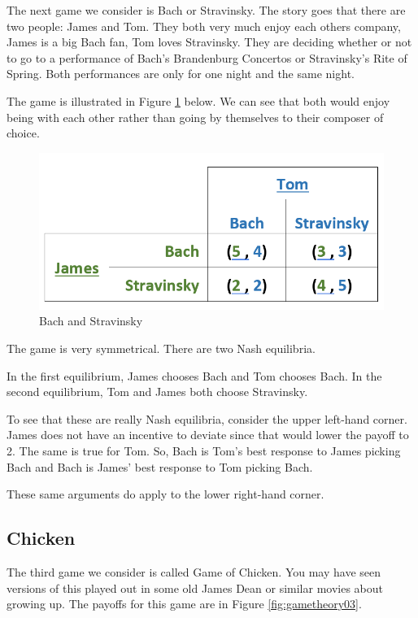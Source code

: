 \documentclass[
]{book}
\begin{document}
The next game we consider is Bach or Stravinsky. The story goes that there are two people: James and Tom. They both very much enjoy each others company, James is a big Bach fan, Tom loves Stravinsky. They are deciding whether or not to go to a performance of Bach's Brandenburg Concertos or Stravinsky's Rite of Spring. Both performances are only for one night and the same night.

The game is illustrated in Figure \ref{fig:gametheory02} below. We can see that both would enjoy being with each other rather than going by themselves to their composer of choice.

\begin{figure}

{\centering \includegraphics[width=0.5\linewidth]{img/gametheory/fig2} 

}

\caption{Bach and Stravinsky}\label{fig:gametheory02}
\end{figure}

The game is very symmetrical. There are two Nash equilibria.

In the first equilibrium, James chooses Bach and Tom chooses Bach. In the second equilibrium, Tom and James both choose Stravinsky.

To see that these are really Nash equilibria, consider the upper left-hand corner. James does not have an incentive to deviate since that would lower the payoff to 2. The same is true for Tom. So, Bach is Tom's best response to James picking Bach and Bach is James' best response to Tom picking Bach.

These same arguments do apply to the lower right-hand corner.

\hypertarget{chicken}{%
\subsection{Chicken}\label{chicken}}

The third game we consider is called Game of Chicken. You may have seen versions of this played out in some old James Dean or similar movies about growing up. The payoffs for this game are in Figure \ref{fig:gametheory03}.
\end{document}
